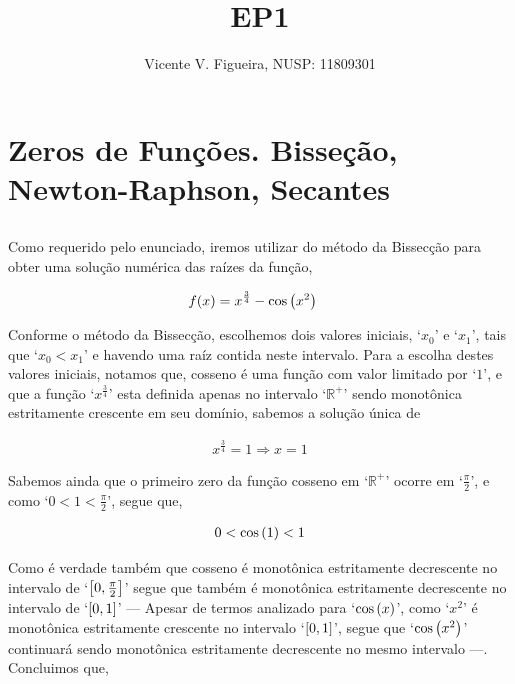 \documentclass[twoside]{amsart}
\title
{
    \Huge EP1
}
\author
{
    \large Vicente V. Figueira, NUSP: 11809301
}
\numberwithin{equation}{section}
\begin{document}
\maketitle





\section{\Large Zeros de Funções. Bisseção, Newton-Raphson, Secantes}

\subsection{}

Como requerido pelo enunciado, iremos utilizar do método da Bissecção para 
obter uma solução numérica das raízes da função,

\begin{align}
    f\qty(x) & = x^{\frac34} - \cos\qty(x^2)\label{f}
\end{align}

Conforme o método da Bissecção, escolhemos dois valores iniciais, `$x_0$' 
e `$x_1$', tais que `$x_0<x_1$' e havendo uma raíz contida neste intervalo.
Para a escolha destes valores iniciais, notamos que, cosseno é uma função 
com valor limitado por `$1$', e que a função `$x^{\frac34}$' esta definida 
apenas no intervalo `$\mathbb R^+$' sendo monotônica estritamente 
crescente em seu domínio, sabemos a solução única de 

\begin{align}
    x^{\frac34} = 1\Rightarrow x = 1\nonumber
\end{align}

Sabemos ainda que o primeiro zero da função cosseno em `$\mathbb R^+$' 
ocorre em `$\frac\pi2$', e como `$0<1<\frac\pi2$', segue que,

\begin{align}
    0<\cos\qty(1)<1
\end{align}

Como é verdade também que cosseno é monotônica estritamente decrescente no 
intervalo de `$\qty[0,\frac\pi2]$' segue que também é monotônica 
estritamente decrescente no intervalo de `$\qty[0,1]$' --- Apesar de termos 
analizado para `$\cos\qty(x)$', como `$x^2$' é monotônica estritamente 
crescente no intervalo `$\qty[0,1]$', segue que `$\cos\qty(x^2)$' 
continuará sendo monotônica estritamente decrescente no mesmo intervalo ---. 
Concluimos que,
\end{document}
